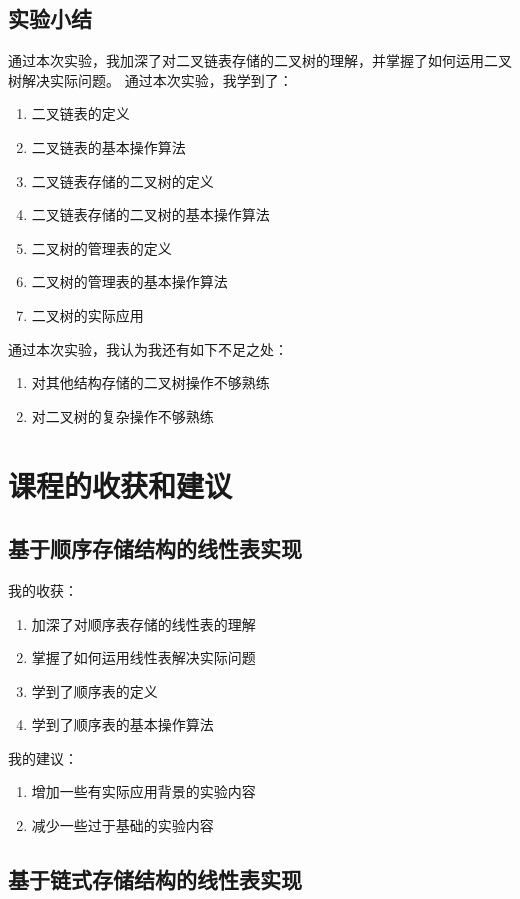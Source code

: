 \documentclass[supercite]{Experimental_Report}
\theoremstyle{definition}
\begin{document}
\subsection{实验小结}
通过本次实验，我加深了对二叉链表存储的二叉树的理解，并掌握了如何运用二叉树解决实际问题。
通过本次实验，我学到了：
\begin{enumerate}
	\item 二叉链表的定义
    \item 二叉链表的基本操作算法
	\item 二叉链表存储的二叉树的定义
    \item 二叉链表存储的二叉树的基本操作算法
    \item 二叉树的管理表的定义
    \item 二叉树的管理表的基本操作算法
    \item 二叉树的实际应用
\end{enumerate}
通过本次实验，我认为我还有如下不足之处：
\begin{enumerate}
	\item 对其他结构存储的二叉树操作不够熟练
    \item 对二叉树的复杂操作不够熟练
\end{enumerate}
\newpage


\section{课程的收获和建议}


\subsection{基于顺序存储结构的线性表实现}

我的收获：
\begin{enumerate}
	\item 加深了对顺序表存储的线性表的理解
    \item 掌握了如何运用线性表解决实际问题
    \item 学到了顺序表的定义
    \item 学到了顺序表的基本操作算法
\end{enumerate}
我的建议：
\begin{enumerate}
	\item 增加一些有实际应用背景的实验内容
    \item 减少一些过于基础的实验内容
\end{enumerate}

\subsection{基于链式存储结构的线性表实现}
\end{document}
